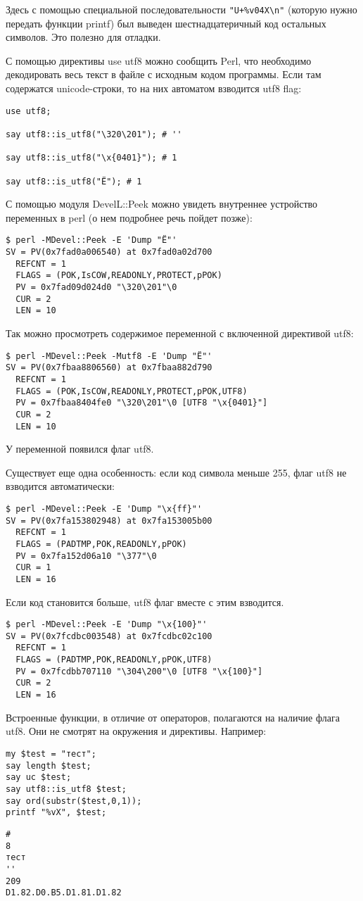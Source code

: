 Здесь с помощью специальной последовательности \verb|"U+%v04X\n"| (которую нужно передать функции printf) был выведен шестнадцатеричный код остальных символов. Это полезно для отладки.

С помощью директивы use utf8 можно сообщить Perl, что необходимо декодировать весь текст в файле с исходным кодом программы. Если там содержатся unicode-строки, то на них автоматом взводится utf8 flag:
\begin{verbatim}
use utf8;

say utf8::is_utf8("\320\201"); # ''

say utf8::is_utf8("\x{0401}"); # 1

say utf8::is_utf8("Ё"); # 1
\end{verbatim}
С помощью модуля DevelL::Peek можно увидеть внутреннее устройство переменных в perl (о нем подробнее речь пойдет позже):
\begin{verbatim}
$ perl -MDevel::Peek -E 'Dump "Ё"'
SV = PV(0x7fad0a006540) at 0x7fad0a02d700
  REFCNT = 1
  FLAGS = (POK,IsCOW,READONLY,PROTECT,pPOK)
  PV = 0x7fad09d024d0 "\320\201"\0
  CUR = 2
  LEN = 10
\end{verbatim}
Так можно просмотреть содержимое переменной с включенной директивой utf8:
\begin{verbatim}
$ perl -MDevel::Peek -Mutf8 -E 'Dump "Ё"'
SV = PV(0x7fbaa8806560) at 0x7fbaa882d790
  REFCNT = 1
  FLAGS = (POK,IsCOW,READONLY,PROTECT,pPOK,UTF8)
  PV = 0x7fbaa8404fe0 "\320\201"\0 [UTF8 "\x{0401}"]
  CUR = 2
  LEN = 10
\end{verbatim}
У переменной появился флаг utf8.

Существует еще одна особенность: если код символа меньше 255, флаг utf8 не взводится автоматически:
\begin{verbatim}
$ perl -MDevel::Peek -E 'Dump "\x{ff}"'
SV = PV(0x7fa153802948) at 0x7fa153005b00
  REFCNT = 1
  FLAGS = (PADTMP,POK,READONLY,pPOK)
  PV = 0x7fa152d06a10 "\377"\0
  CUR = 1
  LEN = 16
\end{verbatim}
Если код становится больше, utf8 флаг вместе с этим взводится.
\begin{verbatim}
$ perl -MDevel::Peek -E 'Dump "\x{100}"'
SV = PV(0x7fcdbc003548) at 0x7fcdbc02c100
  REFCNT = 1
  FLAGS = (PADTMP,POK,READONLY,pPOK,UTF8)
  PV = 0x7fcdbb707110 "\304\200"\0 [UTF8 "\x{100}"]
  CUR = 2
  LEN = 16
\end{verbatim}
Встроенные функции, в отличие от операторов, полагаются на наличие флага utf8. Они не смотрят на окружения и директивы. Например:\\
\begin{verbatim}
my $test = "тест";
say length $test;
say uc $test;
say utf8::is_utf8 $test;
say ord(substr($test,0,1));
printf "%vX", $test;
\end{verbatim}
\begin{verbatim}
#
8
тест
''
209
D1.82.D0.B5.D1.81.D1.82
\end{verbatim}

